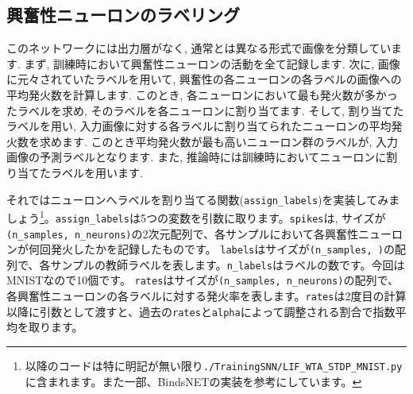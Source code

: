 \subsection{興奮性ニューロンのラベリング}
このネットワークには出力層がなく, 通常とは異なる形式で画像を分類しています. まず, 訓練時において興奮性ニューロンの活動を全て記録します. 次に, 画像に元々されていたラベルを用いて, 興奮性の各ニューロンの各ラベルの画像への平均発火数を計算します. このとき, 各ニューロンにおいて最も発火数が多かったラベルを求め, そのラベルを各ニューロンに割り当てます. そして, 割り当てたラベルを用い, 入力画像に対する各ラベルに割り当てられたニューロンの平均発火数を求めます. このとき平均発火数が最も高いニューロン群のラベルが, 入力画像の予測ラベルとなります. また, 推論時には訓練時においてニューロンに割り当てたラベルを用います.\par
それではニューロンへラベルを割り当てる関数(\texttt{assign\_labels})を実装してみましょう\footnote{以降のコードは特に明記が無い限り\texttt{./TrainingSNN/LIF\_WTA\_STDP\_MNIST.py}に含まれます。また一部、BindsNETの実装を参考にしています。}。\texttt{assign\_labels}は5つの変数を引数に取ります。\texttt{spikes}は, サイズが\texttt{(n\_samples, n\_neurons)}の2次元配列で、各サンプルにおいて各興奮性ニューロンが何回発火したかを記録したものです。 \texttt{labels}はサイズが\texttt{(n\_samples, )}の配列で、各サンプルの教師ラベルを表します。\texttt{n\_labels}はラベルの数です。今回はMNISTなので10個です。 \texttt{rates}はサイズが\texttt{(n\_samples, n\_neurons)}の配列で、各興奮性ニューロンの各ラベルに対する発火率を表します。\texttt{rates}は2度目の計算以降に引数として渡すと、過去の\texttt{rates}と\texttt{alpha}によって調整される割合で指数平均を取ります。
